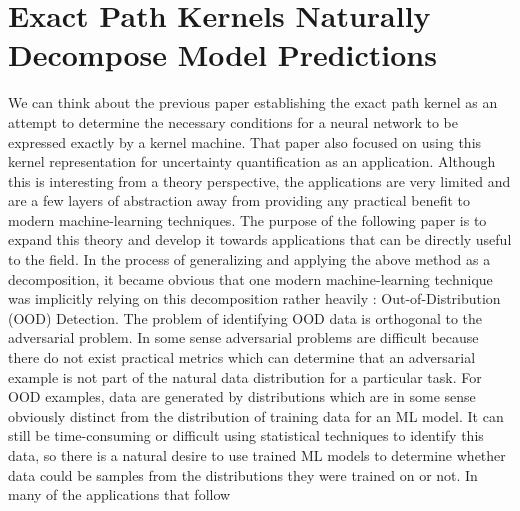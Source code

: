 \chapter{Exact Path Kernels Naturally Decompose Model Predictions}
\label{Chapter4a}

We can think about the previous paper establishing the exact path
kernel as an attempt to determine the necessary conditions for a
neural network to be expressed exactly by a kernel machine. That paper
also focused on using this kernel representation for uncertainty
quantification as an application. Although this is interesting from a
theory perspective, the applications are very limited and are a few
layers of abstraction away from providing any practical benefit to
modern machine-learning techniques. The purpose of the following paper
is to expand this theory and develop it towards applications that can
be directly useful to the field. In the process of generalizing and
applying the above method as a decomposition, it became obvious that
one modern machine-learning technique was implicitly relying on this
decomposition rather heavily : Out-of-Distribution (OOD)
Detection. The problem of identifying OOD data is orthogonal to the
adversarial problem. In some sense adversarial problems are difficult
because there do not exist practical metrics which can determine that
an adversarial example is not part of the natural data distribution
for a particular task. For OOD examples, data are generated by
distributions which are in some sense obviously distinct from the distribution
of training data for an ML model. It can still be time-consuming or
difficult using statistical techniques to identify this data, so there
is a natural desire to use trained ML models to determine whether data
could be samples from the distributions they were trained on or
not. In many of the applications that follow

